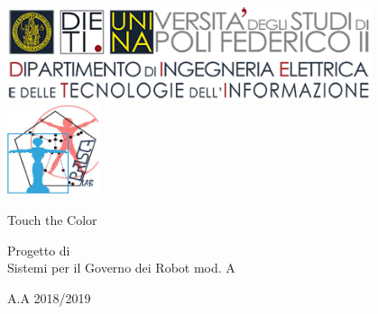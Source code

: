 
\thispagestyle{empty}

\begin{center}
	\includegraphics[width=0.8\textwidth]{images/DIETI}\\
	\includegraphics[width=0.2\textwidth]{images/prisca.jpg}
	
	\par\bigskip\par\bigskip\par\bigskip
	
	{\huge Touch the Color\\}
	
	\par\bigskip\par\bigskip\par\bigskip\par\bigskip\par\bigskip\par\bigskip\par\bigskip\par	%
	
	{\LARGE Progetto di \\}
	{\LARGE Sistemi per il Governo dei Robot mod. A\\}
	{\large A.A 2018/2019\par}
	
	\par\bigskip\par\bigskip\par\bigskip\par\bigskip\par\bigskip\par\bigskip
	

\end{center}
